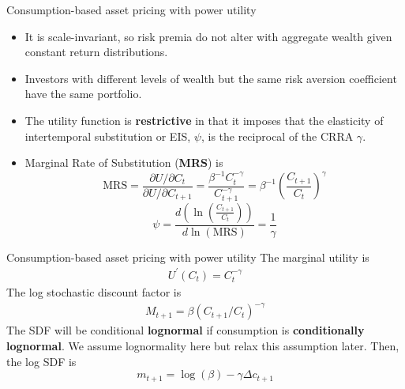 \documentclass{beamer}
\begin{document}
\begin{frame}{Consumption-based asset pricing with power utility}
    \begin{itemize}
	\item It is scale-invariant, so risk premia do not alter with aggregate wealth
	given constant return distributions.
	\item Investors with different levels of wealth but the same risk aversion coefficient have the same portfolio.
	\item The utility function is \textbf{restrictive} in that it imposes that the elasticity of intertemporal substitution or EIS, $ \psi $, is the reciprocal of the CRRA $ \gamma $.
        \item Marginal Rate of Substitution (\textbf{MRS}) is
        \begin{equation*}
\mathrm{MRS}=\frac{\partial U / \partial C_t}{\partial U / \partial C_{t+1}}=\frac{\beta^{-1} C_t^{-\gamma}}{C_{t+1}^{-\gamma}}=\beta^{-1}\left(\frac{C_{t+1}}{C_t}\right)^\gamma
\end{equation*}
\begin{equation*}
\psi=\frac{d (\ln \left(\frac{C_{t+1}}{C_t}\right))}{d \ln (\mathrm{MRS})}=\frac{1}{\gamma}
\end{equation*}
\end{itemize}
\end{frame}

\begin{frame}{Consumption-based asset pricing with power utility}
	The marginal utility is
	\begin{align*}
		U^{\prime}\left(C_{t}\right)=C_{t}^{-\gamma}
	\end{align*}
	The log stochastic discount factor is
	\begin{align*}
		M_{t+1}=\beta\left(C_{t+1} / C_{t}\right)^{-\gamma}
	\end{align*}
The SDF will be conditional \textbf{lognormal} if consumption is \textbf{conditionally lognormal}. We assume lognormality here but relax this assumption later. Then, the log SDF is
\begin{equation} \label{equ:logSDF}
	m_{t+1}=\log (\beta)-\gamma \Delta c_{t+1}
\end{equation}

\end{frame}
\end{document}

